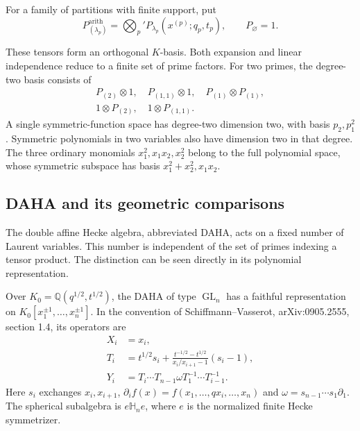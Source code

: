 \begin{definition}\label{v4-arith:def:arithmetic-macdonald-poly}
For a family of partitions with finite support, put
\[
 P^{\mathrm{arith}}_{(\lambda_p)}
 =\bigotimes_p'P_{\lambda_p}(x^{(p)};q_p,t_p),
 \qquad P_\varnothing=1.
\]
\end{definition}

These tensors form an orthogonal $K$-basis. Both expansion and
linear independence reduce to a finite set of prime factors.
For two primes, the degree-two basis consists of
\[
 \begin{gathered}
 P_{(2)}\otimes1,\quad P_{(1,1)}\otimes1,\quad
 P_{(1)}\otimes P_{(1)},\\
 1\otimes P_{(2)},\quad1\otimes P_{(1,1)}.
 \end{gathered}
\]
A single symmetric-function space has degree-two dimension two,
with basis $p_2,p_1^2$. Symmetric polynomials in two variables also
have dimension two in that degree. The three ordinary monomials
$x_1^2,x_1x_2,x_2^2$ belong to the full polynomial space, whose
symmetric subspace has basis $x_1^2+x_2^2,x_1x_2$.

\subsection{DAHA and its geometric comparisons}
\label{v4-arith:et:no-prime-daha}

The double affine Hecke algebra, abbreviated DAHA, acts on a fixed
number of Laurent variables. This number is independent of the
set of primes indexing a tensor product. The distinction can be
seen directly in its polynomial representation.

\begin{theorem}
\label{v4-arith:thm:DAHA-rank}
Over $K_0=\mathbb Q(q^{1/2},t^{1/2})$, the DAHA of type
$\operatorname{GL}_n$ has a faithful representation on
$K_0[x_1^{\pm1},\ldots,x_n^{\pm1}]$. In the convention of
Schiffmann--Vasserot, arXiv:0905.2555, section 1.4, its operators are
\[
 \begin{split}
 X_i&=x_i,\\
 T_i&=t^{1/2}s_i+
       \frac{t^{-1/2}-t^{1/2}}{x_i/x_{i+1}-1}(s_i-1),\\
 Y_i&=T_i\cdots T_{n-1}\omega T_1^{-1}\cdots T_{i-1}^{-1}.
 \end{split}
\]
Here $s_i$ exchanges $x_i,x_{i+1}$,
$\partial_i f(x)=f(x_1,\ldots,qx_i,\ldots,x_n)$ and
$\omega=s_{n-1}\cdots s_1\partial_1$.
The spherical subalgebra is $e\mathbb H_ne$, where $e$ is the
normalized finite Hecke symmetrizer.
\end{theorem}

